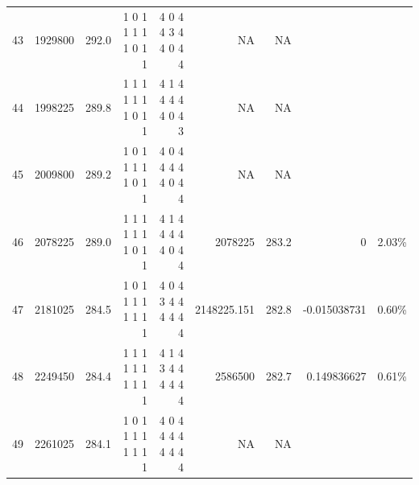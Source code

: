 \documentclass[10pt,journal,compsoc]{IEEEtran}
\begin{document}
\begin{table}[ht]
{\begin{tabular}{|*{9}{r|}}
43	&1929800&   292.0	&1 0 1 1 1 1 1 0 1 1	&4 0 4 4 3 4 4 0 4 4	&			NA	&NA&&\\
44	&1998225&   289.8	&1 1 1 1 1 1 1 0 1 1	&4 1 4 4 4 4 4 0 4 3	&			NA	&NA&&\\
45	&2009800&   289.2	&1 0 1 1 1 1 1 0 1 1	&4 0 4 4 4 4 4 0 4 4	&			NA	&NA&&\\
46	&2078225&   289.0	&1 1 1 1 1 1 1 0 1 1	&4 1 4 4 4 4 4 0 4 4	&	     \cellcolor{blizzardblue}  2078225	&\cellcolor{blizzardblue}283.2	&\cellcolor{blizzardblue}0&\cellcolor{blizzardblue}	2.03\%\\
47	&2181025&   284.5	&1 0 1 1 1 1 1 1 1 1	&4 0 4 3 4 4 4 4 4 4	&	      \cellcolor{blizzardblue} 2148225.151&	\cellcolor{blizzardblue}282.8	&\cellcolor{blizzardblue}-0.015038731	&\cellcolor{blizzardblue}0.60\%\\
48	&2249450&   284.4	&1 1 1 1 1 1 1 1 1 1	&4 1 4 3 4 4 4 4 4 4	&	      \cellcolor{blizzardblue} 2586500	&\cellcolor{blizzardblue}282.7	&\cellcolor{blizzardblue}0.149836627	&\cellcolor{blizzardblue}0.61\%\\
49	&2261025&   284.1	&1 0 1 1 1 1 1 1 1 1	&4 0 4 4 4 4 4 4 4 4	&			NA&	NA&&\\
\hline
\end{tabular}}
\end{table}
\end{document}
